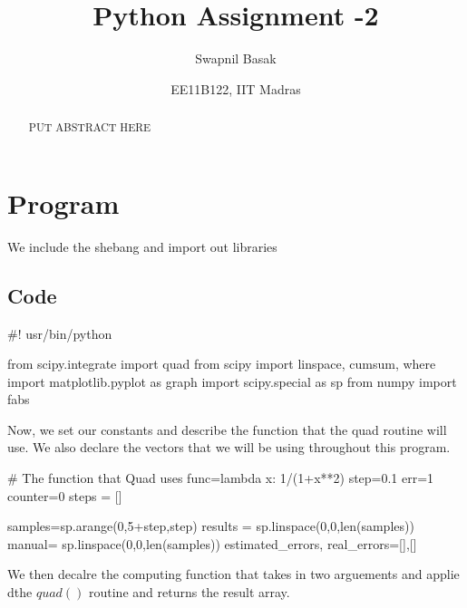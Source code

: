 \documentclass[canadian]{article}
\begin{document}
\title{Python Assignment -2}


\author{Swapnil Basak}


\date{EE11B122, IIT Madras}
\maketitle
\begin{abstract}
PUT ABSTRACT HERE
\end{abstract}

\section*{Program}

We include the shebang and import out libraries


\subsection*{Code}

\endmoddef\nwstartdeflinemarkup\nwenddeflinemarkup

#! usr/bin/python

from scipy.integrate import quad
from scipy import linspace, cumsum, where
import matplotlib.pyplot as graph
import scipy.special as sp
from numpy import fabs  

\nwendcode{}\nwdocspar

%
Now, we set our constants and describe the function that the quad
routine will use. We also declare the vectors that we will be using
throughout this program.


\nwenddocs{}\endmoddef\nwstartdeflinemarkup\nwenddeflinemarkup

# The function that Quad uses
func=lambda x: 1/(1+x**2)
step=0.1
err=1
counter=0
steps = []

samples=sp.arange(0,5+step,step)
results = sp.linspace(0,0,len(samples))
manual= sp.linspace(0,0,len(samples))
estimated_errors, real_errors=[],[]

\nwendcode{}\nwdocspar

%
We then decalre the computing function that takes in two arguements
and applie dthe $quad()$ routine and returns the result array.
\end{document}
